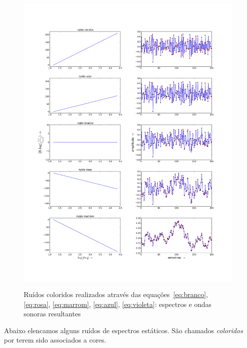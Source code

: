 \begin{figure}[htpq!]
    \centering
    \caption{Ruídos coloridos realizados através das equações~\ref{eq:branco}, \ref{eq:rosa}, \ref{eq:marrom}, \ref{eq:azul}, \ref{eq:violeta}: espectros e ondas sonoras resultantes}
        \includegraphics[width=\textwidth]{figuras/ruidos___}
        \label{fig:ruidos}
\end{figure}


Abaixo elencamos alguns ruídos de espectros estáticos. São chamados \emph{coloridos} por terem sido associados a cores. 

